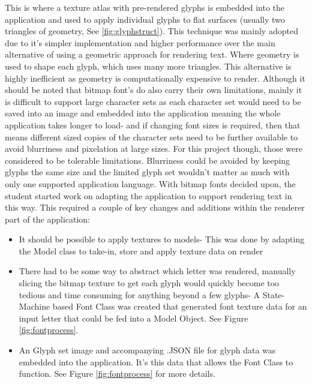 This is where a texture atlas with pre-rendered glyphs is embedded into the application and used to apply individual glyphs to flat surfaces (usually two triangles of geometry, See \ref{fig:glyphstruct}). This technique was mainly adopted due to it's simpler implementation and higher performance over the main alternative of using a geometric approach for rendering text. Where geometry is used to shape each glyph, which uses many more triangles. This alternative is highly inefficient as geometry is computationally expensive to render. Although it should be noted that bitmap font's do also carry their own limitations, mainly it is difficult to support large character sets as each character set would need to be saved into an image and embedded into the application meaning the whole application takes longer to load- and if changing font sizes is required, then that means different sized copies of the character sets need to be further available to avoid blurriness and pixelation at large sizes.
For this project though, those were considered to be tolerable limitations. Blurriness could be avoided by keeping glyphs the same size and the limited glyph set wouldn't matter as much with only one supported application language.
With bitmap fonts decided upon, the student started work on adapting the application to support rendering text in this way. This required a couple of key changes and additions within the renderer part of the application:
\begin{itemize}
    \item It should be possible to apply textures to models- This was done by adapting the Model class to take-in, store and apply texture data on render
    \item There had to be some way to abstract which letter was rendered, manually slicing the bitmap texture to get each glyph would quickly become too tedious and time consuming for anything beyond a few glyphs- A State-Machine based Font Class was created that generated font texture data for an input letter that could be fed into a Model Object. See Figure \ref{fig:fontprocess}.
    \item An Glyph set image and accompanying .JSON file for glyph data was embedded into the application. It's this data that allows the Font Class to function. See Figure \ref{fig:fontprocess} for more details.
\end{itemize}

